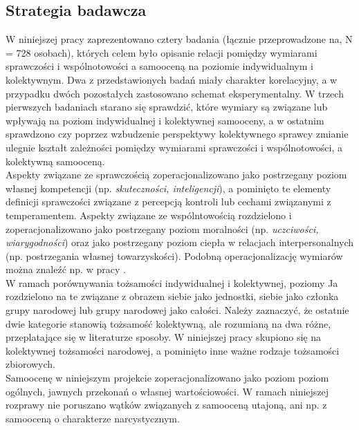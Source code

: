 \documentclass[man]{apa6}
\begin{document}
\subsection{Strategia badawcza}

W niniejszej pracy zaprezentowano cztery badania (łącznie przeprowadzone na, N = 728 osobach), których celem było opisanie relacji pomiędzy wymiarami sprawczości i wspólnotowości a samooceną na poziomie indywidualnym i kolektywnym. Dwa z przedstawionych badań miały charakter korelacyjny, a w przypadku dwóch pozostałych zastosowano schemat eksperymentalny. W trzech pierwszych badaniach starano się sprawdzić, które wymiary są związane lub wpływają na poziom indywidualnej i kolektywnej samooceny, a w ostatnim sprawdzono czy poprzez wzbudzenie perspektywy kolektywnego sprawcy zmianie ulegnie kształt zależności pomiędzy wymiarami sprawczości i wspólnotowości, a kolektywną samooceną. \\
Aspekty związane ze sprawczością zoperacjonalizowano jako postrzegany poziom własnej kompetencji (np. \emph{skuteczności, inteligencji}), a pominięto te elementy definicji sprawczości związane z percepcją kontroli lub cechami związanymi z temperamentem. Aspekty związane ze wspólntowością rozdzielono i zoperacjonalizowano jako postrzegany poziom moralności (np. \emph{uczciwości, wiarygodności}) oraz jako postrzegany poziom ciepła w relacjach interpersonalnych (np. postrzegania własnej towarzyskości). Podobną operacjonalizację wymiarów można znaleźć np. w pracy \textcite{leach2007group}.\\
W ramach porównywania tożsamości indywidualnej i kolektywnej, poziomy Ja rozdzielono na te związane z obrazem siebie jako jednostki, siebie jako członka grupy narodowej lub grupy narodowej jako całości. Należy zaznaczyć, że ostatnie dwie kategorie stanowią tożsamość kolektywną, ale rozumianą na dwa różne, przeplatające się w literaturze sposoby. W niniejszej pracy skupiono się na kolektywnej tożsamości narodowej, a pominięto inne ważne rodzaje tożsamości zbiorowych.\\
Samoocenę w niniejszym projekcie zoperacjonalizowano jako poziom poziom ogólnych, jawnych przekonań o własnej wartościowości. W ramach niniejszej rozprawy nie poruszano wątków związanych z samooceną utajoną, ani np. z samooceną o charakterze narcystycznym.
\end{document}
